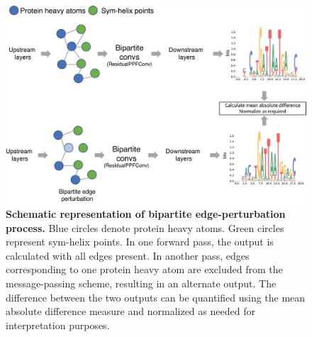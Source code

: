 \begin{center}
\begin{figure}[H]
  \includegraphics[width=\linewidth]{./pdnafigs/figS4.png}
    \caption[Schematic representation of bipartite edge-perturbation process.]{\textbf{Schematic representation of bipartite edge-perturbation process.} Blue circles denote protein heavy atoms.
Green circles represent sym-helix points. In one forward pass, the output is calculated with all edges present. In
another pass, edges corresponding to one protein heavy atom are excluded from the message-passing scheme,
resulting in an alternate output. The difference between the two outputs can be quantified using the mean absolute
difference measure and normalized as needed for interpretation purposes.}
  \label{fig:pdnaS4}
\end{figure}
\end{center}

